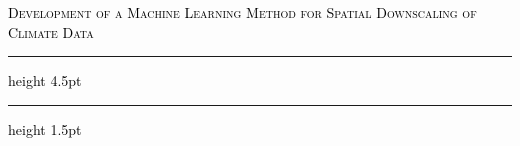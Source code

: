 \begin{center}
\chaptitlefont %
\begin{center}\textcolor{black}{\textsc{Development of a Machine Learning Method for Spatial Downscaling of Climate Data}}
\end{center}
\end{center}
\vspace{8mm}
\textcolor{black}{\hrule height 4.5pt}%
\vspace{1mm}
\textcolor{black}{\hrule height 1.5pt}
